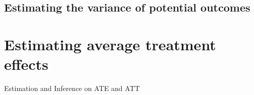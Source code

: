 \documentclass[12pt]{article}
\begin{document}
\subsection{Estimating the variance of potential outcomes}

\newpage

\section{Estimating average treatment effects}

\begin{landscape}
\begin{table}
\centering
\caption{Estimation and Inference on ATE and ATT}\label{tab:tableQ2}
\subfloat[][ATE]{}\quad
\subfloat[][ATT]{}
\end{table}
\end{landscape}
\end{document}
